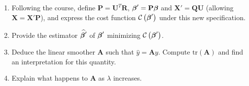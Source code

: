 \documentclass[a4paper,12pt]{article}\usepackage[]{graphicx}\usepackage[]{color}
\def\by{\mathbf{y}}
\def\bbeta{\mbox{\boldmath $\beta$}}
\def\bX{\mathbf{X}}
\def\op{\left(}
\def\cp{\right)}
\def\oc{\left[}
\def\cc{\right]}
\begin{document}
\begin{enumerate}
  \item Following the course, define $\mathbf{P} = \mathbf{U}^T\mathbf{R}$, $\bbeta' = \mathbf{P} \bbeta$ and $\bX' = \mathbf{Q}\mathbf{U}$ (allowing $\bX = \bX' \mathbf{P}$), and express the cost function $\mathcal{C}\op\bbeta'\cp$ under this new specification.
  \item Provide the estimator $\widehat{\bbeta'}$ of $\bbeta'$ minimizing $\mathcal{C}\op\bbeta'\cp$.
  \item Deduce the linear smoother $\mathbf{A}$ such that $\widehat{y} = \mathbf{A} y$. Compute $\mathrm{tr}(\mathbf{A})$ and           find an interpretation for this quantity.
  \item Explain what happens to $\mathbf{A}$ as $\lambda$ increases.
\end{enumerate}
\end{document}
